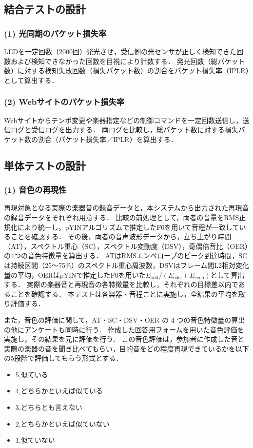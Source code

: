 \documentclass[lualatex,book,openany,paper=a4paper,jafontsize=11.5pt,jafontscale=1.05]{jlreq}
\begin{document}
\subsection{結合テストの設計}

\subsubsection*{(1) 光同期のパケット損失率}
LEDを一定回数（2000回）発光させ，受信側の光センサが正しく検知できた回数および検知できなかった回数を目視により計数する．
発光回数（総パケット数）に対する検知失敗回数（損失パケット数）の割合をパケット損失率（IPLR）として算出する．

\subsubsection*{(2) Webサイトのパケット損失率}

Webサイトからテンポ変更や楽器指定などの制御コマンドを一定回数送信し，送信ログと受信ログを出力する．
両ログを比較し，総パケット数に対する損失パケット数の割合（パケット損失率／IPLR）を算出する．

\subsection{単体テストの設計}

\subsubsection*{(1) 音色の再現性}

再現対象となる実際の楽器音の録音データと，本システムから出力された再現音の録音データをそれぞれ用意する．
比較の前処理として，両者の音量をRMS正規化により統一し，pYINアルゴリズムで推定したF0を用いて音程が一致していることを確認する．
その後，両者の音声波形データから，立ち上がり時間（AT），スペクトル重心（SC），スペクトル変動度（DSV），奇偶倍音比（OER）の4つの音色特徴量を算出する．
ATはRMSエンベロープのピーク到達時間，SCは持続区間（25〜75\%）のスペクトル重心周波数，DSVはフレーム間L2相対変化量の平均，OERはpYINで推定したF0を用いた$E_{\mathrm{odd}}/(E_{\mathrm{odd}}+E_{\mathrm{even}})$として算出する．
実際の楽器音と再現音の各特徴量を比較し，それぞれの目標差以内であることを確認する．
本テストは各楽器・音程ごとに実施し，全結果の平均を取り評価する．

また，音色の評価に関して，AT・SC・DSV・OER の 4 つの音色特徴量の算出の他にアンケートも同時に行う．
作成した回答用フォームを用いた音色評価を実施し，その結果を元に評価を行う．
この音色評価は，参加者に作成した音と実際の楽器の音を聞き比べてもらい，目的音をどの程度再現できているかを以下の5段階で評価してもらう形式とする．
\begin{itemize}
    \item 5,似ている
    \item 4,どちらかといえば似ている
    \item 3,どちらとも言えない
    \item 2,どちらかといえば似ていない
    \item 1,似ていない
\end{itemize}
\end{document}
